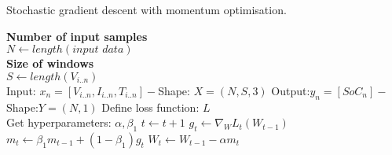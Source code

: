 \begin{algorithm}[H]%
  \caption{Stochastic gradient descent with momentum optimisation.}
  \begin{algorithmic}[1]
    \STATE \textbf{Number of input samples} \\ $N\gets length(\textit{input data})$\\
    \STATE \textbf{Size of windows} \\ $S\gets length(V_{i..n})$\\
    \STATE Input: $x_n = [V_{i..n}, I_{i..n}, T_{i..n}] - $Shape: $X = (N, S, 3)$
    \STATE Output:$y_n = [SoC_{n}] - $Shape:$Y = (N, 1)$
    \STATE Define loss function: $L$ \\
    Get hyperparameters: $\alpha, \beta_1$
      \STATE $t \gets t+1$
      \STATE $g_t \gets \nabla_W L_t (W_{t-1})$ 
      \STATE $m_t \gets \beta_1 m_{t-1}+(1-\beta_1) g_t $ 
      \STATE $W_t \gets W_{t-1} - \alpha m_t $ 
    \ENDWHILE
  \end{algorithmic}
  \label{alg:SGDwM}
\end{algorithm}

%
